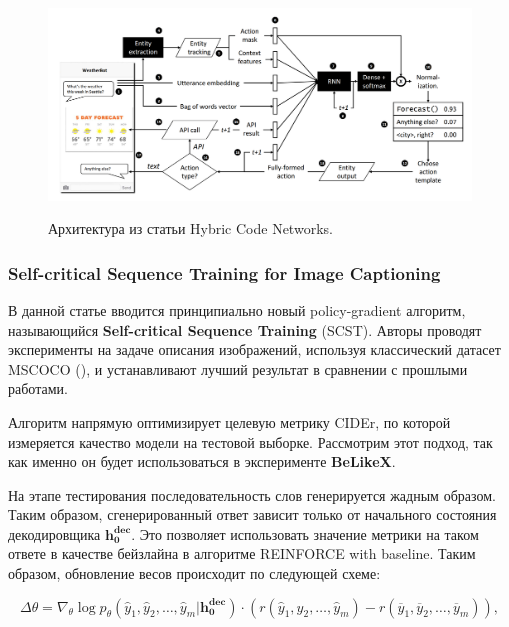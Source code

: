 \documentclass[12pt,a4paper]{amsart}
\begin{document}
\begin{figure}[htbp!]
	\caption{Архитектура из статьи Hybric Code Networks.}
	\includegraphics[width=\textwidth]{imgs/hcn.png}
	\label{fig:hcn}
	\centering
\end{figure}


\subsubsection*{\textbf{Self-critical Sequence Training for Image Captioning}}

В данной статье вводится принципиально новый policy-gradient алгоритм, называющийся \textbf{Self-critical Sequence Training} (SCST). Авторы проводят эксперименты на задаче описания изображений, используя классический датасет MSCOCO (\cite{DBLP:journals/corr/LinMBHPRDZ14}), и устанавливают лучший результат в сравнении с прошлыми работами.

Алгоритм напрямую оптимизирует целевую метрику CIDEr, по которой измеряется качество модели на тестовой выборке. Рассмотрим этот подход, так как именно он будет использоваться в эксперименте \textbf{BeLikeX}.

На этапе тестирования последовательность слов генерируется жадным образом. Таким образом, сгенерированный ответ зависит только от начального состояния декодировщика $\mathbf{h^{\text{dec}}_0}$. Это позволяет использовать значение метрики на таком ответе в качестве бейзлайна в алгоритме REINFORCE with baseline. Таким образом, обновление весов происходит по следующей схеме:

\begin{equation} \label{eq:rl-scst}
\Delta \theta = \nabla_\theta \log p_{\theta}(\hat{y}_1, \hat{y}_2, \dots, \hat{y}_m | \mathbf{h^{\text{dec}}_0}) \cdot (r(\hat{y}_1, \hat{y}_2, \dots, \hat{y}_m) - r(\overline{y}_1, \overline{y}_2, \dots, \overline{y}_m)),
\end{equation}
\end{document}
